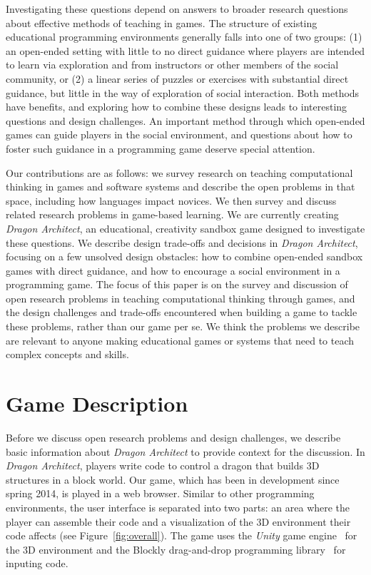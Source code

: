 \documentclass{sig-alternate}
\newcommand{\gametitle}{{\emph{Dragon Architect}}}
\begin{document}
Investigating these questions depend on answers to broader research questions about effective methods of teaching in games. The structure of existing educational programming environments generally falls into one of two groups: (1) an open-ended setting with little to no direct guidance where players are intended to learn via exploration and from instructors or other members of the social community, or (2) a linear series of puzzles or exercises with substantial direct guidance, but little in the way of exploration of social interaction. Both methods have benefits, and exploring how to combine these designs leads to interesting questions and design challenges. An important method through which open-ended games can guide players in the social environment, and questions about how to foster such guidance in a programming game deserve special attention.

Our contributions are as follows: we survey research on teaching computational thinking in games and software systems and describe the open problems in that space, including how languages impact novices. We then survey and discuss related research problems in game-based learning. We are currently creating \gametitle{}, an educational, creativity sandbox game designed to investigate these questions. We describe design trade-offs and decisions in \gametitle{}, focusing on a few unsolved design obstacles: how to combine open-ended sandbox games with direct guidance, and how to encourage a social environment in a programming game. The focus of this paper is on the survey and discussion of open research problems in teaching computational thinking through games, and the design challenges and trade-offs encountered when building a game to tackle these problems, rather than our game per se. We think the problems we describe are relevant to anyone making educational games or systems that need to teach complex concepts and skills.

\section{Game Description}
Before we discuss open research problems and design challenges, we describe basic information about \gametitle{} to provide context for the discussion.
In \gametitle{}, players write code to control a dragon that builds 3D structures in a block world.
Our game, which has been in development since spring 2014, is played in a web browser.
Similar to other programming environments, the user interface is separated into two parts: an area where the player can assemble their code and a visualization of the 3D environment their code affects (see Figure~\ref{fig:overall}). 
The game uses the \emph{Unity} game engine~\cite{unity} for the 3D environment and the Blockly drag-and-drop programming library~\cite{blockly} for inputing code.
\end{document}
